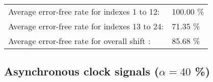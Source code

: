 \begin{table}[h]
\begin{center}
\begin{tabular}{|c|c|c|c|c|}
\end{tabular}


\flushleft
\begin{tabular}{l l}
Average error-free rate for indexes  1 to 12: & 100.00 \% \\
Average error-free rate for indexes 13 to 24: &  71.35 \% \\
Average error-free rate for overall shift   : &  85.68 \% \\

\end{tabular}


\end{center}
\end{table}


\pagebreak
\subsection{Asynchronous clock signals ($\alpha=40$ \%)}

